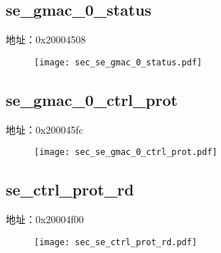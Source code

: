 \subsection{se\_gmac\_0\_status}
\label{sec-se-gmac-0-status}
地址：0x20004508
 \begin{figure}[H]
\texttt{[image: sec\_se\_gmac\_0\_status.pdf]}
\end{figure}

\subsection{se\_gmac\_0\_ctrl\_prot}
\label{sec-se-gmac-0-ctrl-prot}
地址：0x200045fc
 \begin{figure}[H]
\texttt{[image: sec\_se\_gmac\_0\_ctrl\_prot.pdf]}
\end{figure}

\subsection{se\_ctrl\_prot\_rd}
\label{sec-se-ctrl-prot-rd}
地址：0x20004f00
 \begin{figure}[H]
\texttt{[image: sec\_se\_ctrl\_prot\_rd.pdf]}
\end{figure}


